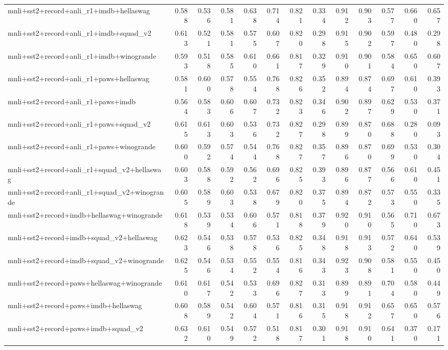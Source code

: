 \begin{table}[t]
\begin{tabular}{lrrrrrrrrrrrr}
    mnli+sst2+record+anli\_r1+imdb+hellaswag & 0.588 & 0.536 & 0.581 & 0.638 & 0.714 & 0.821 & 0.334 & 0.912 & 0.903 & 0.577 & 0.660 & 0.657 \\
    mnli+sst2+record+anli\_r1+imdb+squad\_v2 & 0.613 & 0.521 & 0.581 & 0.575 & 0.607 & 0.820 & 0.298 & 0.915 & 0.902 & 0.597 & 0.480 & 0.298 \\
    mnli+sst2+record+anli\_r1+imdb+winogrande & 0.593 & 0.518 & 0.585 & 0.610 & 0.661 & 0.817 & 0.329 & 0.910 & 0.901 & 0.584 & 0.650 & 0.607 \\
    mnli+sst2+record+anli\_r1+paws+hellaswag & 0.581 & 0.600 & 0.578 & 0.554 & 0.768 & 0.826 & 0.352 & 0.894 & 0.874 & 0.697 & 0.610 & 0.393 \\
    mnli+sst2+record+anli\_r1+paws+imdb & 0.564 & 0.583 & 0.606 & 0.607 & 0.732 & 0.823 & 0.346 & 0.902 & 0.897 & 0.629 & 0.530 & 0.371 \\
    mnli+sst2+record+anli\_r1+paws+squad\_v2 & 0.615 & 0.613 & 0.603 & 0.536 & 0.732 & 0.827 & 0.298 & 0.899 & 0.870 & 0.688 & 0.280 & 0.093 \\
    mnli+sst2+record+anli\_r1+paws+winogrande & 0.600 & 0.592 & 0.574 & 0.544 & 0.768 & 0.827 & 0.357 & 0.896 & 0.870 & 0.699 & 0.530 & 0.304 \\
    mnli+sst2+record+anli\_r1+squad\_v2+hellaswag & 0.603 & 0.588 & 0.592 & 0.562 & 0.696 & 0.825 & 0.393 & 0.896 & 0.877 & 0.566 & 0.610 & 0.451 \\
    mnli+sst2+record+anli\_r1+squad\_v2+winogrande & 0.605 & 0.589 & 0.603 & 0.538 & 0.679 & 0.820 & 0.375 & 0.894 & 0.872 & 0.573 & 0.550 & 0.335 \\
    mnli+sst2+record+imdb+hellaswag+winogrande & 0.618 & 0.539 & 0.534 & 0.606 & 0.571 & 0.818 & 0.379 & 0.920 & 0.910 & 0.565 & 0.710 & 0.673 \\
    mnli+sst2+record+imdb+squad\_v2+hellaswag & 0.623 & 0.546 & 0.538 & 0.578 & 0.536 & 0.825 & 0.348 & 0.918 & 0.913 & 0.572 & 0.640 & 0.539 \\
    mnli+sst2+record+imdb+squad\_v2+winogrande & 0.625 & 0.546 & 0.534 & 0.552 & 0.554 & 0.816 & 0.343 & 0.923 & 0.908 & 0.581 & 0.550 & 0.450 \\
    mnli+sst2+record+paws+hellaswag+winogrande & 0.610 & 0.617 & 0.542 & 0.533 & 0.696 & 0.827 & 0.313 & 0.899 & 0.891 & 0.704 & 0.580 & 0.449 \\
    mnli+sst2+record+paws+imdb+hellaswag & 0.608 & 0.589 & 0.542 & 0.604 & 0.571 & 0.816 & 0.315 & 0.918 & 0.912 & 0.657 & 0.650 & 0.576 \\
    mnli+sst2+record+paws+imdb+squad\_v2 & 0.632 & 0.610 & 0.549 & 0.572 & 0.518 & 0.817 & 0.301 & 0.918 & 0.910 & 0.641 & 0.370 & 0.171 \\

\end{tabular}
\end{table}
